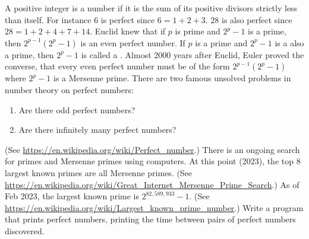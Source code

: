   A positive integer is a  number if it is the
  sum of its positive divisors strictly less than itself.
  For instance $6$ is perfect since $6 = 1 + 2 + 3$.
  $28$ is also perfect since $28 = 1 + 2 + 4 + 7 + 14$.
  Euclid knew that if $p$ is prime and $2^p - 1$ is a prime,
  then $2^{p-1}(2^p - 1)$ is an even perfect number.
  If $p$ is a prime and $2^p - 1$ is a also a prime,
  then $2^p - 1$ is called a .
  Almost 2000 years after Euclid, Euler proved the converse, that
  every even perfect number must be of the form
  $2^{p-1}(2^p - 1)$ where $2^p - 1$ is a Mersenne prime.
  There are two famous unsolved problems in number theory on perfect
  numbers:
  \begin{enumerate}[nosep]
  \item Are there odd perfect numbers?
  \item Are there infinitely many perfect numbers?
  \end{enumerate}
  (See \url{https://en.wikipedia.org/wiki/Perfect_number}.)
  There is an ongoing search for primes and Mersenne primes using
  computers.
  At this point (2023), the top 8 largest known primes are all
  Mersenne primes.
  (See \url{https://en.wikipedia.org/wiki/Great_Internet_Mersenne_Prime_Search}.)
  As of Feb 2023, the largest known prime is $2^{82,589,933} - 1$.
  (See \url{https://en.wikipedia.org/wiki/Largest_known_prime_number}.)
  Write a program that prints perfect numbers, printing the time between pairs of
  perfect numbers discovered.
